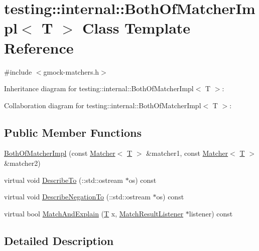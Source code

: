 \hypertarget{classtesting_1_1internal_1_1_both_of_matcher_impl}{}\section{testing\+:\+:internal\+:\+:Both\+Of\+Matcher\+Impl$<$ T $>$ Class Template Reference}
\label{classtesting_1_1internal_1_1_both_of_matcher_impl}


{\ttfamily \#include $<$gmock-\/matchers.\+h$>$}



Inheritance diagram for testing\+:\+:internal\+:\+:Both\+Of\+Matcher\+Impl$<$ T $>$\+:


Collaboration diagram for testing\+:\+:internal\+:\+:Both\+Of\+Matcher\+Impl$<$ T $>$\+:
\subsection*{Public Member Functions}
\begin{DoxyCompactItemize}
\item 
\hyperlink{classtesting_1_1internal_1_1_both_of_matcher_impl_a41760fcb35ba18ac2a0eb580ac61ea9a}{Both\+Of\+Matcher\+Impl} (const \hyperlink{classtesting_1_1_matcher}{Matcher}$<$ \hyperlink{functions__7_8js_adf1f3edb9115acb0a1e04209b7a9937b}{T} $>$ \&matcher1, const \hyperlink{classtesting_1_1_matcher}{Matcher}$<$ \hyperlink{functions__7_8js_adf1f3edb9115acb0a1e04209b7a9937b}{T} $>$ \&matcher2)
\item 
virtual void \hyperlink{classtesting_1_1internal_1_1_both_of_matcher_impl_a7b808e95bfee6ea6035e8820896d5d32}{Describe\+To} (\+::std\+::ostream $\ast$os) const 
\item 
virtual void \hyperlink{classtesting_1_1internal_1_1_both_of_matcher_impl_a4db4b4119cc2b742e5139922d56e514c}{Describe\+Negation\+To} (\+::std\+::ostream $\ast$os) const 
\item 
virtual bool \hyperlink{classtesting_1_1internal_1_1_both_of_matcher_impl_ad0311a21d4c8231a824a396b9f4d09a1}{Match\+And\+Explain} (\hyperlink{functions__7_8js_adf1f3edb9115acb0a1e04209b7a9937b}{T} x, \hyperlink{classtesting_1_1_match_result_listener}{Match\+Result\+Listener} $\ast$listener) const 
\end{DoxyCompactItemize}


\subsection{Detailed Description}
